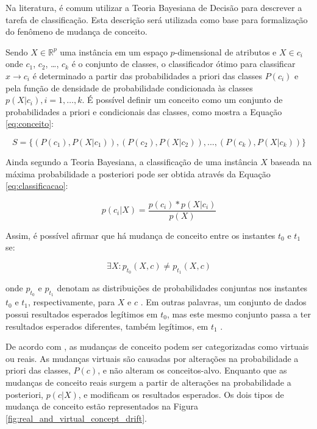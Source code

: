\documentclass[msc, classic, a4paper]{ufbathesis}
\begin{document}
Na literatura, é comum utilizar a Teoria Bayesiana de Decisão \cite{Duda:2000:PC:954544} para descrever a tarefa de classificação.
Esta descrição será utilizada como base para formalização do fenômeno de mudança de conceito.

Sendo $X \in \mathbb{R}^p$ uma instância em um espaço $p$-dimensional de atributos e $X \in c_i$ onde $c_1$, $c_2$, \ldots, $c_k$ é o conjunto de classes,
o classificador ótimo para classificar $x \rightarrow c_i$ é determinado a partir das probabilidades a priori das classes $P(c_i)$ e pela função de densidade de probabilidade condicionada às classes $p(X|c_i), i = 1, \ldots, k$.
É possível definir um conceito como um conjunto de probabilidades a priori e condicionais das classes, como mostra a Equação \ref{eq:conceito}:

\begin{equation} \label{eq:conceito}
    S = \{(P(c_1), P(X|c_1)), (P(c_2), P(X|c_2)), ..., (P(c_k), P(X|c_k))\}
\end{equation}

Ainda segundo a Teoria Bayesiana, a classificação de uma instância $X$ baseada na máxima probabilidade a posteriori pode ser obtida através da Equação \ref{eq:classificacao}:

\begin{equation} \label{eq:classificacao}
    p(c_i|X) = \frac{p(c_i) * p(X|c_i)}{p(X)}
\end{equation}

Assim, é possível afirmar que há mudança de conceito entre os instantes $t_0$ e $t_1$ se:

\begin{equation} \label{eq:3}
    {\exists}X : p_{t_0}(X, c) \ne p_{t_1}(X, c)
\end{equation}

onde $p_{t_0}$ e $p_{t_1}$ denotam as distribuições de probabilidades conjuntas nos instantes $t_0$ e $t_1$, respectivamente,
para $X$ e $c$ \cite{Gama:2014:SCD:2597757.2523813}.
Em outras palavras, um conjunto de dados possui resultados esperados legítimos em $t_0$, mas este mesmo conjunto passa a ter resultados esperados diferentes, também legítimos, em $t_1$ \cite{Kolter:2007:DWM:1314498.1390333}.

De acordo com , as mudanças de conceito podem ser categorizadas como virtuais ou reais.
As mudanças virtuais são causadas por alterações na probabilidade a priori das classes, $P(c)$, e não alteram os conceitos-alvo.
Enquanto que as mudanças de conceito reais surgem a partir de alterações na probabilidade a posteriori, $p(c|X)$, e modificam os resultados esperados.
Os dois tipos de mudança de conceito estão representados na Figura \ref{fig:real_and_virtual_concept_drift}.
\end{document}
